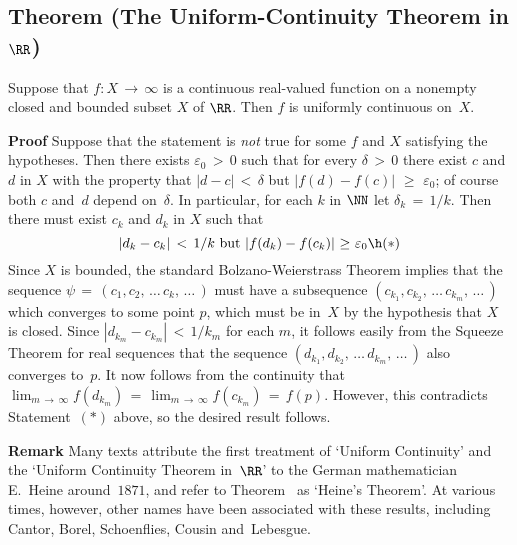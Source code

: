 \VV

            \subsection{\small{\bf Theorem} (The Uniform-Continuity Theorem in ${\RR}$)}
            \label{ThmD25.70}

\V

        Suppose that $f:X \,{\rightarrow}\, {\infty}$ is a continuous real-valued function on a nonempty closed and bounded subset $X$ of ${\RR}$.
    Then $f$ is uniformly continuous on~$X$.

\V

        {\bf Proof} Suppose that the statement is {\em not} true for some $f$ and $X$ satisfying the hypotheses.
    Then there exists ${\varepsilon}_{0}\,>\,0$ such that for every ${\delta}\,>\,0$ there exist $c$ and $d$ in $X$
    with the property that $|d-c|\,<\,{\delta}$ but $|f(d)-f(c)|\,\,{\geq}\,\,{\varepsilon}_{0}$;
    of course both $c$ and~$d$ depend on~${\delta}$. In particular, for each $k$ in ${\NN}$ let ${\delta}_{k} \,=\, 1/k$.
    Then there must exist $c_{k}$ and $d_{k}$ in $X$ such that
        \begin{displaymath}
        |d_{k}-c_{k}|\,<\,1/k \mbox{ but }|f(d_{k})-f(c_{k})|\,\,{\geq}\,\,{\varepsilon}_{0} \h ({\ast})
        \end{displaymath}
    Since $X$ is bounded, the standard Bolzano-Weierstrass Theorem implies that the sequence
    ${\psi} \,=\, (c_{1},c_{2},\,{\ldots}\,c_{k},\,{\ldots}\,)$ must have a subsequence
    $(c_{k_{1}}, c_{k_{2}},\,{\ldots}\,c_{k_{m}},\,{\ldots}\,)$ which converges to some point $p$, which must be in~$X$ by the hypothesis that $X$ is closed.
    Since $|d_{k_{m}}-c_{k_{m}}|\,<\,1/k_{m}$ for each $m$, it follows easily from the Squeeze Theorem
    for real sequences that the sequence $(d_{k_{1}}, d_{k_{2}},\,{\ldots}\,d_{k_{m}},\,{\ldots}\,)$ also converges to~$p$.
    It now follows from the continuity that $\lim_{m \,{\rightarrow}\, {\infty}} f(d_{k_{m}}) \,=\, \lim_{m \,{\rightarrow}\, {\infty}} f(c_{k_{m}}) \,=\, f(p)$.
    However, this contradicts Statement~$({\ast})$ above, so the desired result follows.

\VV

        {\bf Remark} Many texts attribute the first treatment of `Uniform Continuity' and the `Uniform Continuity Theorem in~${\RR}$'
    to the German mathematician E.~Heine around~$1871$, and refer to Theorem~ as `Heine's Theorem'.
    At various times, however, other names have been associated with these results, including Cantor, Borel, Schoenflies, Cousin and~Lebesgue.

